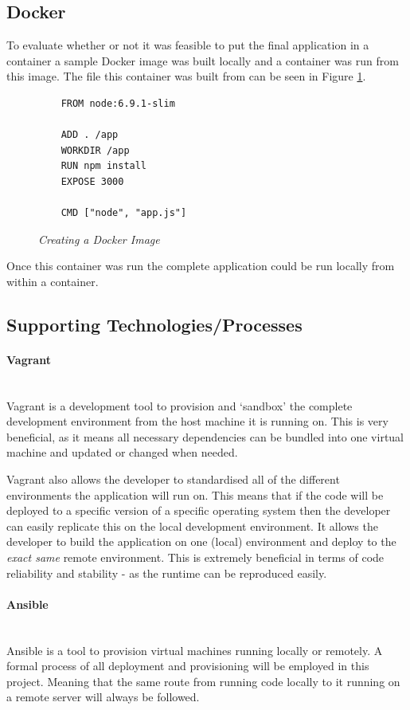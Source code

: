 \subsection{Docker}
To evaluate whether or not it was feasible to put the final application in a container a sample Docker image was built locally and a container was run from this image. The file this container was built from can be seen in Figure \ref{fig:docker}.

\begin{figure}[!ht]
\begin{lstlisting}
	FROM node:6.9.1-slim

	ADD . /app  
	WORKDIR /app  
	RUN npm install  
	EXPOSE 3000

	CMD ["node", "app.js"]  
\end{lstlisting}
\caption{\em Creating a Docker Image}
\label{fig:docker}
\end{figure}

Once this container was run the complete application could be run locally from within a container.

\subsection{Supporting Technologies/Processes}
\label{subs:support}
\paragraph{Vagrant}\mbox{}\\
Vagrant is a development tool to provision and `sandbox' the complete development environment from the host machine it is running on. This is very beneficial, as it means all necessary dependencies can be bundled into one virtual machine and updated or changed when needed. 

Vagrant also allows the developer to standardised all of the different environments the application will run on. This means that if the code will be deployed to a specific version of a specific operating system then the developer can easily replicate this on the local development environment. It allows the developer to build the application on one (local) environment and deploy to the \textit{exact same} remote environment. This is extremely beneficial in terms of code reliability and stability - as the runtime can be reproduced easily.
\paragraph{Ansible}\mbox{}\\
Ansible is a tool to provision virtual machines running locally or remotely. A formal process of all deployment and provisioning will be employed in this project. Meaning that the same route from running code locally to it running on a remote server will always be followed.

